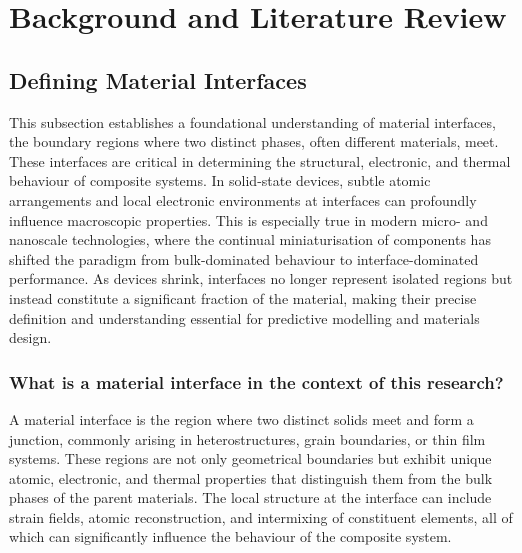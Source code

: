 \chapter{Background and Literature Review} \label{chapter:background}

\section{Defining Material Interfaces} \label{section:material_interfaces}

This subsection establishes a foundational understanding of material interfaces, the boundary regions where two distinct phases, often different materials, meet. These interfaces are critical in determining the structural, electronic, and thermal behaviour of composite systems. In solid-state devices, subtle atomic arrangements and local electronic environments at interfaces can profoundly influence macroscopic properties. This is especially true in modern micro- and nanoscale technologies, where the continual miniaturisation of components has shifted the paradigm from bulk-dominated behaviour to interface-dominated performance. As devices shrink, interfaces no longer represent isolated regions but instead constitute a significant fraction of the material, making their precise definition and understanding essential for predictive modelling and materials design.

\subsection{What is a material interface in the context of this research?}

A material interface is the region where two distinct solids meet and form a junction, commonly arising in heterostructures, grain boundaries, or thin film systems. These regions are not only geometrical boundaries but exhibit unique atomic, electronic, and thermal properties that distinguish them from the bulk phases of the parent materials. The local structure at the interface can include strain fields, atomic reconstruction, and intermixing of constituent elements, all of which can significantly influence the behaviour of the composite system.

